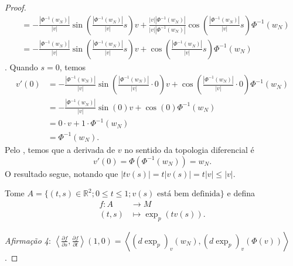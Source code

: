 \begin{theorem}
\begin{proof}
\begin{align*}
                  & = -\frac{|\Phi ^{-1}(w_N)|}{|v|} \sin\left( \frac{|\Phi ^{-1}(w_N)|}{|v|}s \right) v + \frac{|v| |\Phi ^{-1}(w_N)|}{|v| |\Phi ^{-1}(w_N)|} \cos\left( \frac{|\Phi ^{-1}(w_N)|}{|v|}s \right) \Phi ^{-1}(w_N)    \\
                  & = -\frac{|\Phi ^{-1}(w_N)|}{|v|} \sin\left( \frac{|\Phi ^{-1}(w_N)|}{|v|}s \right) v + \cos\left( \frac{|\Phi ^{-1}(w_N)|}{|v|}s \right) \Phi ^{-1}(w_N)
        \end{align*}.
        Quando $s=0$, temos
        \begin{align*}
            v'(0) & = -\frac{|\Phi ^{-1}(w_N)|}{|v|} \sin\left( \frac{|\Phi ^{-1}(w_N)|}{|v|} \cdot 0 \right) v + \cos\left( \frac{|\Phi ^{-1}(w_N)|}{|v|} \cdot 0 \right) \Phi ^{-1}(w_N) \\
                  & = -\frac{|\Phi ^{-1}(w_N)|}{|v|} \sin(0) v + \cos(0) \Phi ^{-1}(w_N)                                                                                                   \\
                  & = 0 \cdot v + 1 \cdot \Phi ^{-1}(w_N)                                                                                                                                  \\
                  & = \Phi ^{-1}(w_N).
        \end{align*}
        Pelo , temos que a derivada de $v$ no sentido da topologia diferencial é
        \begin{equation*}
            v'(0)=\Phi(\Phi ^{-1}(w_{N}))=w_{N}.
        \end{equation*}
        O resultado segue, notando que $|tv(s)|= t|v(s)|=t|v| \leq|v|$.

        Tome $A=\{ (t,s)\in \mathbb{R}^{2}; 0\leq t\leq1;v(s) \text{ está bem definida}\}$ e defina
        \begin{align*}
            f:A   & \to M                         \\
            (t,s) & \longmapsto \exp _{p}(tv(s)).
        \end{align*}

        \emph{Afirmação 4}: $\left\langle \frac{\partial f}{\partial s}, \frac{\partial f}{\partial t} \right\rangle{(1,0)} = \left\langle (d\exp_p)_v (w_{N}), (d\exp_p)_v (\Phi(v)) \right\rangle$.


\end{proof}
\end{theorem}
